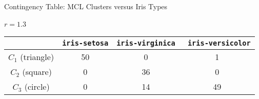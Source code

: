 \begin{frame}{Contingency Table: MCL Clusters versus Iris Types}
  \framesubtitle{$r=1.3$}
\renewcommand{\arraystretch}{1.1}
\begin{center}
\begin{tabular}{|c|c|c|c|}
        \hline
         & {\tt iris-setosa} & {\tt iris-virginica} & {\tt
         iris-versicolor}\\
         \hline
        $C_1$ (triangle) & 50 & 0 & 1\\
        $C_2$ (square) & 0 & 36 & 0\\
        $C_3$ (circle) & 0 & 14 & 49 \\
        \hline
    \end{tabular}
\end{center}
\end{frame}
